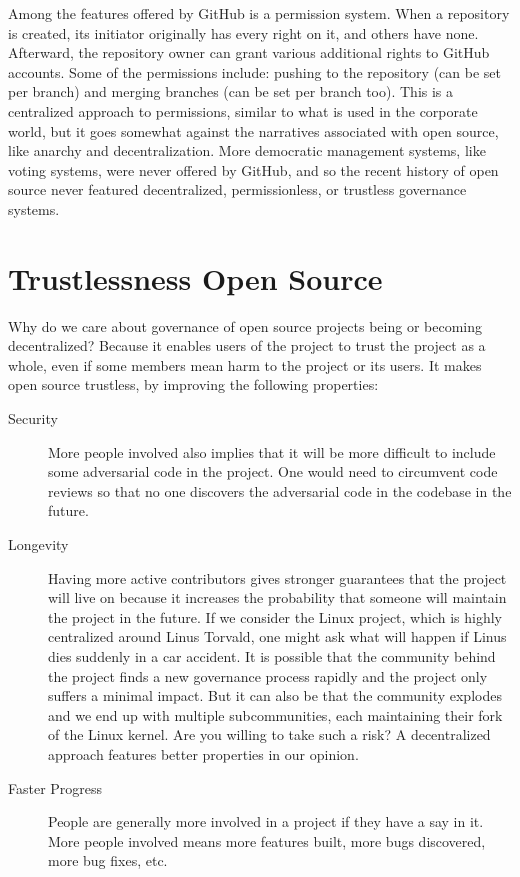 Among the features offered by GitHub is a permission system.
When a repository is created, its initiator originally has every right on it, and others have none.
Afterward, the repository owner can grant various additional rights to GitHub accounts.
Some of the permissions include: pushing to the repository (can be set per branch) and merging branches (can be set per branch too).
This is a centralized approach to permissions, similar to what is used in the corporate world, but it goes somewhat against the narratives associated with open source, like anarchy and decentralization.
More democratic management systems, like voting systems, were never offered by GitHub, and so the recent history of open source never featured decentralized, permissionless, or trustless governance systems.

\section{Trustlessness Open Source}

Why do we care about governance of open source projects being or becoming decentralized?
Because it enables users of the project to trust the project as a whole, even if some members mean harm to the project or its users.
It makes open source trustless, by improving the following properties:

\begin{description}
  \item[Security]
  	More people involved also implies that it will be more difficult to include some adversarial code in the project.
  	One would need to circumvent code reviews so that no one discovers the adversarial code in the codebase in the future.
  \item[Longevity]
		Having more active contributors gives stronger guarantees that the project will live on because it increases the probability that someone will maintain the project in the future.
    If we consider the Linux project, which is highly centralized around Linus Torvald, one might ask what will happen if Linus dies suddenly in a car accident.
    It is possible that the community behind the project finds a new governance process rapidly and the project only suffers a minimal impact.
    But it can also be that the community explodes and we end up with multiple subcommunities, each maintaining their fork of the Linux kernel.
    Are you willing to take such a risk?
    A decentralized approach features better properties in our opinion.
  \item[Faster Progress]
    People are generally more involved in a project if they have a say in it.
		More people involved means more features built, more bugs discovered, more bug fixes, etc.
\end{description}

